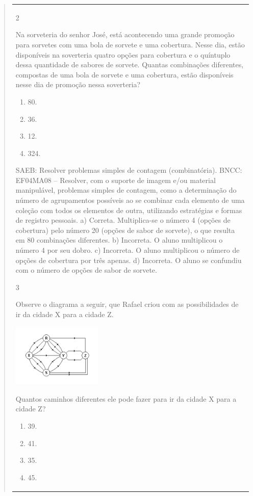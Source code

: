 \begin{mdframed}[linewidth=2pt,linecolor=salmao,roundcorner=2pt]
\begin{itemize}
{\begin{itemize}
\begin{escolha}
{\begin{quote}
{\begin{escolha}
{{{{{\begin{longtable}[]{@{}l@{}}
\begin{itemize}
{\num{2}

Na sorveteria do senhor José, está acontecendo uma grande promoção para
sorvetes com uma bola de sorvete e uma cobertura. Nesse dia, estão
disponíveis na soverteria quatro opções para cobertura e o quíntuplo dessa
quantidade de sabores de sorvete. Quantas combinações diferentes, compostas de uma bola de
sorvete e uma cobertura, estão disponíveis nesse dia de promoção nessa
soverteria?

\begin{enumerate}
\item
  80.
\item
  36.
\item
  12.
\item
  324.
\end{enumerate}

SAEB: Resolver problemas simples de contagem (combinatória).
BNCC: EF04MA08 -- Resolver, com o suporte de imagem e/ou material manipulável, problemas simples
de contagem, como a determinação do número de agrupamentos possíveis ao se combinar cada
elemento de uma coleção com todos os elementos de outra, utilizando estratégias e formas de
registro pessoais.
a) Correta. Multiplica-se o número 4 (opções de cobertura) pelo número 20 (opções de sabor de sorvete), o que resulta em 80 combinações diferentes.
b) Incorreta. O aluno multiplicou o número 4 por seu dobro.
c) Incorreta. O aluno multiplicou o número de opções de cobertura por três apenas.
d) Incorreta. O aluno se confundiu com o número de opções de sabor de sorvete.

\num{3}

Observe o diagrama a seguir, que Rafael criou com as possibilidades de ir
da cidade X para a cidade Z.


\includegraphics[width=1.68348in,height=1.18344in]{media/image141.png}

Quantos caminhos diferentes ele pode fazer para ir da cidade X para a
cidade Z?

\begin{enumerate}
\item
  39.
\item
  41.
\item
  35.
\item
  45.
\end{enumerate}

}
\end{itemize}
\end{longtable}}}}}}
\end{escolha}}
\end{quote}}
\end{escolha}
\end{itemize}}
\end{itemize}
\end{mdframed}
